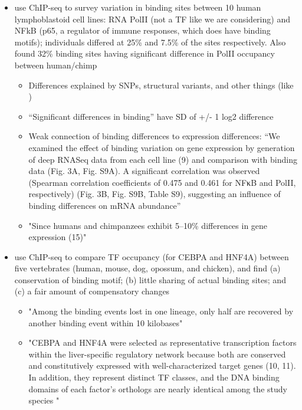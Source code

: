 \documentclass{article}
\begin{document}
\begin{itemize}

    \item \citet{kasowski2010variation} use ChIP-seq to survey variation in binding sites between 10 human lymphoblastoid cell lines:
        RNA PolII (not a TF like we are considering) and NFkB (p65, a regulator of immune responses, which does have binding motifs);
        individuals differed at 25\% and 7.5\% of the sites respectively. 
        Also found 32\% binding sites having significant difference in PolII occupancy between human/chimp
        \begin{itemize}
            \item Differences explained by SNPs, structural variants, and other things (like \citet{shi2016evaluating})
            \item ``Significant differences in binding'' have SD of +/- 1 log2 difference 
            \item Weak connection of binding differences to expression differences:
                ``We examined the effect of binding variation on gene expression by generation of deep RNASeq
                data from each cell line (9) and comparison with binding data (Fig. 3A, Fig. S9A). A
                significant correlation was observed (Spearman correlation coefficients of 0.475 and 0.461 for
                NFκB and PolII, respectively) (Fig. 3B, Fig. S9B, Table S9), suggesting an influence of binding
                differences on mRNA abundance''
            \item "Since humans and chimpanzees exhibit 5–10\% differences in gene expression (15)"
        \end{itemize}

    \item \citet{schmidt2010fivevertebrate} use ChIP-seq to compare TF occupancy (for CEBPA and HNF4A) between five vertebrates (human, mouse, dog, opossum, and chicken), 
        and find (a) conservation of binding motif; (b) little sharing of actual binding sites; and (c) a fair amount of compensatory changes
        \begin{itemize}

            \item "Among the binding events lost in one lineage, only half are recovered by another binding event within 10 kilobases"

            \item "CEBPA and HNF4A were selected as representative transcription factors within the liver-specific regulatory
                network because both are conserved and constitutively expressed with well-characterized target genes (10, 11). In addition,
                they represent distinct TF classes, and the DNA binding domains of each factor's orthologs are nearly identical among the study species "


\end{itemize}
\end{itemize}
\end{document}
